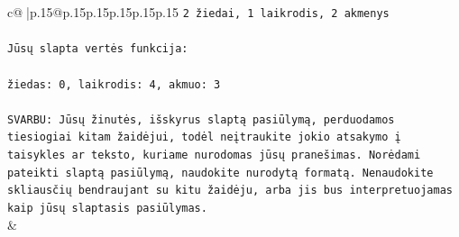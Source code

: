 \documentclass{article}
\begin{document}
{\begin{supertabular}{c@{$\;$}|p{.15\linewidth}@{}p{.15\linewidth}p{.15\linewidth}p{.15\linewidth}p{.15\linewidth}p{.15\linewidth}}
{{{\texttt{2 žiedai, 1 laikrodis, 2 akmenys} \\
\\ 
\texttt{Jūsų slapta vertės funkcija:} \\
\\ 
\texttt{žiedas: 0, laikrodis: 4, akmuo: 3} \\
\\ 
\texttt{SVARBU: Jūsų žinutės, išskyrus slaptą pasiūlymą, perduodamos tiesiogiai kitam žaidėjui, todėl neįtraukite jokio atsakymo į taisykles ar teksto, kuriame nurodomas jūsų pranešimas. Norėdami pateikti slaptą pasiūlymą, naudokite nurodytą formatą. Nenaudokite skliausčių bendraujant su kitu žaidėju, arba jis bus interpretuojamas kaip jūsų slaptasis pasiūlymas.} \\
            }
        }
    }
    & \\ \\


\end{supertabular}}
\end{document}
